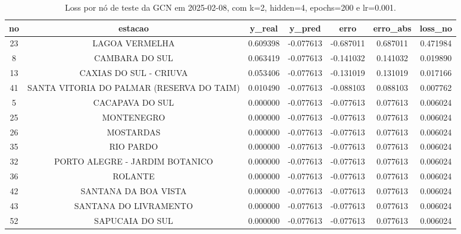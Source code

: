 \begin{table}[h]
\centering
\caption{Loss por nó de teste da GCN em 2025-02-08, com k=2, hidden=4, epochs=200 e lr=0.001.}
\label{tab:gcn_loss_nodes_k2_hidden4}
\begin{tabular}{ccccccc}
\toprule
no & estacao & y\_real & y\_pred & erro & erro\_abs & loss\_no \\
\midrule
23 & LAGOA VERMELHA & 0.609398 & -0.077613 & -0.687011 & 0.687011 & 0.471984 \\
8 & CAMBARA DO SUL & 0.063419 & -0.077613 & -0.141032 & 0.141032 & 0.019890 \\
13 & CAXIAS DO SUL - CRIUVA & 0.053406 & -0.077613 & -0.131019 & 0.131019 & 0.017166 \\
41 & SANTA VITORIA DO PALMAR (RESERVA DO TAIM) & 0.010490 & -0.077613 & -0.088103 & 0.088103 & 0.007762 \\
5 & CACAPAVA DO SUL & 0.000000 & -0.077613 & -0.077613 & 0.077613 & 0.006024 \\
25 & MONTENEGRO & 0.000000 & -0.077613 & -0.077613 & 0.077613 & 0.006024 \\
26 & MOSTARDAS & 0.000000 & -0.077613 & -0.077613 & 0.077613 & 0.006024 \\
35 & RIO PARDO & 0.000000 & -0.077613 & -0.077613 & 0.077613 & 0.006024 \\
32 & PORTO ALEGRE - JARDIM BOTANICO & 0.000000 & -0.077613 & -0.077613 & 0.077613 & 0.006024 \\
36 & ROLANTE & 0.000000 & -0.077613 & -0.077613 & 0.077613 & 0.006024 \\
42 & SANTANA DA BOA VISTA & 0.000000 & -0.077613 & -0.077613 & 0.077613 & 0.006024 \\
43 & SANTANA DO LIVRAMENTO & 0.000000 & -0.077613 & -0.077613 & 0.077613 & 0.006024 \\
52 & SAPUCAIA DO SUL & 0.000000 & -0.077613 & -0.077613 & 0.077613 & 0.006024 \\
\bottomrule
\end{tabular}
\end{table}
